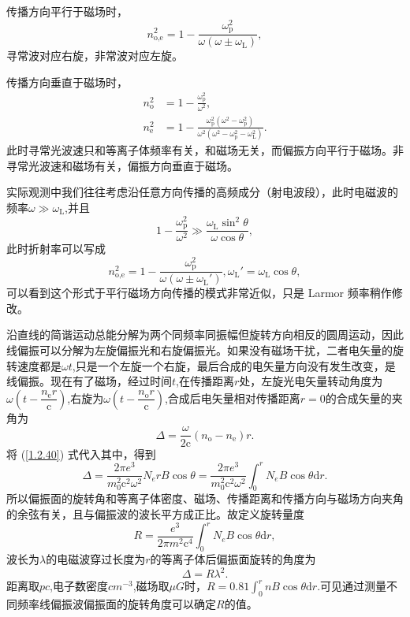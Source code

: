 \documentclass[../天体物理基础.tex]{subfiles}
\begin{document}
传播方向平行于磁场时，
\begin{equation}
n_{\text{o,e}}^{2}=1-\frac{\omega_{\text{p}}^{2}}{\omega\left(\omega\pm\omega_{\text{L}}\right)},
\end{equation}
寻常波对应右旋，非常波对应左旋。

传播方向垂直于磁场时，
\begin{align}
n_{\text{o}}^{2}&=1-\frac{\omega^{2}_{\text{p}}}{\omega^{2}},\\
n_{\text{e}}^{2}&=1-\frac{\omega_{\text{p}}^{2}\left(\omega^{2}-\omega_{\text{p}}^{2}\right)}{\omega^{2}\left(\omega^{2}-\omega_{\text{p}}^{2}-\omega_{\text{L}}^{2}\right)}.
\end{align}
此时寻常光波速只和等离子体频率有关，和磁场无关，而偏振方向平行于磁场。非寻常光波速和磁场有关，偏振方向垂直于磁场。

实际观测中我们往往考虑沿任意方向传播的高频成分（射电波段），此时电磁波的频率$\omega\gg\omega_{\text{L}}$,并且
\begin{equation}
1-\frac{\omega_{\text{p}}^{2}}{\omega^{2}}\gg\frac{\omega_{\text{L}}\sin^{2}\theta}{\omega\cos\theta},
\end{equation}
此时折射率可以写成
\begin{equation}
n^{2}_{\text{o,e}}=1-\frac{\omega_{\text{p}}^{2}}{\omega\left(\omega\pm\omega_{\text{L}}'\right)},\omega_{\text{L}}'=\omega_{\text{L}}\cos\theta,\label{1.2.40}
\end{equation}
可以看到这个形式于平行磁场方向传播的模式非常近似，只是 Larmor 频率稍作修改。

沿直线的简谐运动总能分解为两个同频率同振幅但旋转方向相反的圆周运动，因此线偏振可以分解为左旋偏振光和右旋偏振光。如果没有磁场干扰，二者电矢量的旋转速度都是$\omega t$,只是一个左旋一个右旋，最后合成的电矢量方向没有发生改变，是线偏振。现在有了磁场，经过时间$t$,在传播距离$r$处，左旋光电矢量转动角度为$\omega\left(t-\dfrac{n_{\text{e}}r}{\mathrm{c}}\right)$,右旋为$\omega\left(t-\dfrac{n_{\text{o}}r}{\mathrm{c}}\right)$,合成后电矢量相对传播距离$r=0$的合成矢量的夹角为
\begin{equation}
\Delta{}=\frac{\omega}{2\mathrm{c}}\left(n_{\text{o}}-n_{\text{e}}\right)r.
\end{equation}
将 (\ref{1.2.40}) 式代入其中，得到
\begin{equation}
\Delta{}=\frac{2\pi e^{3}}{m_{0}^{2}\mathrm{c}^{2}\omega^{2}}N_{e}rB\cos\theta=\frac{2\pi e^{3}}{m_{0}^{2}\mathrm{c}^{2}\omega^{2}}\int_{0}^{r}N_{e}B\cos\theta\mathrm{d}r.
\end{equation}
所以偏振面的旋转角和等离子体密度、磁场、传播距离和传播方向与磁场方向夹角的余弦有关，且与偏振波的波长平方成正比。故定义旋转量度
\begin{equation}
R=\frac{e^{3}}{2\pi m^{2}\mathrm{c}^{4}}\int_{0}^{r}N_{e}B\cos\theta\mathrm{d}r,
\end{equation}
波长为$\lambda$的电磁波穿过长度为$r$的等离子体后偏振面旋转的角度为
\begin{equation}
\Delta{}=R\lambda^{2}.
\end{equation}
距离取$\unit{pc}$,电子数密度$\unit{cm^{-3}}$,磁场取$\unit{\mu G}$时，$R=0.81\int_{0}^{r}nB\cos\theta\mathrm{d}r$.可见通过测量不同频率线偏振波偏振面的旋转角度可以确定$R$的值。
\end{document}
